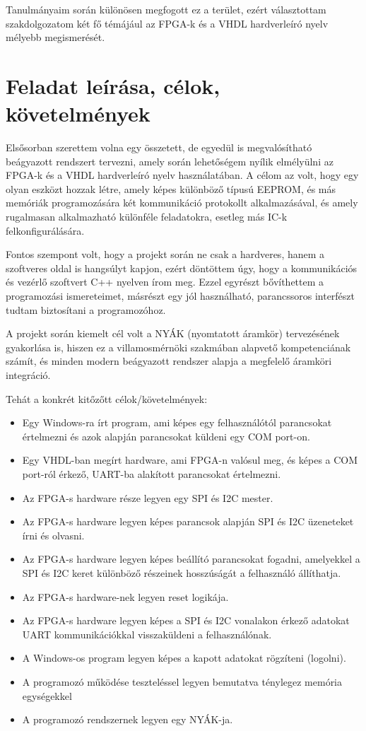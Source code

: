 \documentclass[a4paper,12pt,oneside]{book}
\begin{document}
Tanulmányaim során különösen megfogott ez a terület, ezért választottam szakdolgozatom két fő témájául az FPGA-k és a VHDL hardverleíró nyelv mélyebb megismerését. 

\chapter{Feladat leírása, célok, követelmények}

Elsősorban szerettem volna egy összetett, de egyedül is megvalósítható beágyazott rendszert tervezni, amely során lehetőségem nyílik elmélyülni az FPGA-k és a VHDL hardverleíró nyelv használatában. A célom az volt, hogy egy olyan eszközt hozzak létre, amely képes különböző típusú EEPROM, és más memóriák programozására két kommunikáció protokollt alkalmazásával, és amely rugalmasan alkalmazható különféle feladatokra, esetleg más IC-k felkonfigurálására.

Fontos szempont volt, hogy a projekt során ne csak a hardveres, hanem a szoftveres oldal is hangsúlyt kapjon, ezért döntöttem úgy, hogy a kommunikációs és vezérlő szoftvert C++ nyelven írom meg. Ezzel egyrészt bővíthettem a programozási ismereteimet, másrészt egy jól használható, parancssoros interfészt tudtam biztosítani a programozóhoz.

A projekt során kiemelt cél volt a NYÁK (nyomtatott áramkör) tervezésének gyakorlása is, hiszen ez a villamosmérnöki szakmában alapvető kompetenciának számít, és minden modern beágyazott rendszer alapja a megfelelő áramköri integráció.

Tehát a konkrét kitőzőtt célok/követelmények:
\begin{itemize}
    \item Egy Windows-ra írt program, ami képes egy felhasználótól parancsokat értelmezni és azok alapján parancsokat küldeni egy COM port-on.
    \item Egy VHDL-ban megírt hardware, ami FPGA-n valósul meg, és képes a COM port-ról érkező, UART-ba alakított parancsokat értelmezni.
    \item Az FPGA-s hardware része legyen egy SPI és I2C mester.
    \item Az FPGA-s hardware legyen képes parancsok alapján SPI és I2C üzeneteket írni és olvasni.
    \item Az FPGA-s hardware legyen képes beállító parancsokat fogadni, amelyekkel a SPI és I2C keret különböző részeinek hosszúságát a felhasználó állíthatja.
    \item Az FPGA-s hardware-nek legyen reset logikája.
    \item Az FPGA-s hardware legyen képes a SPI és I2C vonalakon érkező adatokat UART kommunikációkkal visszaküldeni a felhasználónak.
    \item A Windows-os program legyen képes a kapott adatokat rögzíteni (logolni).
    \item A programozó működése teszteléssel legyen bemutatva ténylegez memória egységekkel
    \item A programozó rendszernek legyen egy NYÁK-ja.
\end{itemize}
\end{document}
